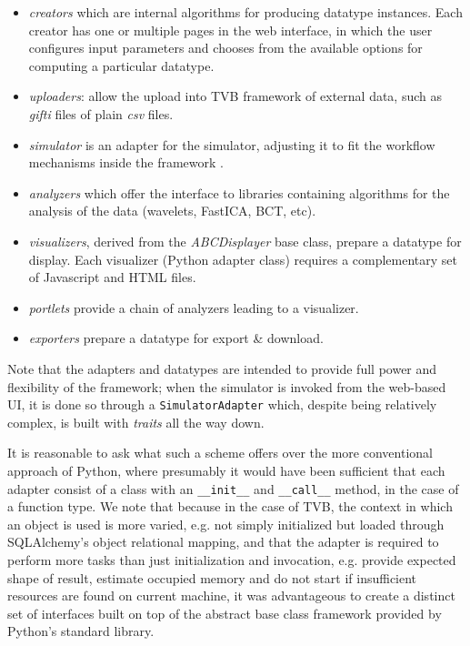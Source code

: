 \begin{itemize}
	\item \textit{creators} which are internal algorithms for producing datatype instances. 
		Each creator has one or multiple pages in the web interface, in which the user
		 configures input parameters and chooses from the available options for computing a particular datatype.

	\item \textit{uploaders}: allow the upload into TVB framework of external data, 
    		such as \emph{gifti} files of plain \emph{csv} files.

	\item \textit{simulator} is an adapter for the simulator, adjusting it to fit
		the workflow mechanisms inside the framework .

	\item \textit{analyzers} which offer the interface to libraries containing algorithms 
		for the analysis of the data (wavelets, FastICA, BCT, etc).

	\item \textit{visualizers}, derived from the \emph{ABCDisplayer} base class, prepare a datatype
		for display. Each visualizer (Python adapter class) requires a complementary set
		of Javascript and HTML files. 

	\item \textit{portlets} provide a chain of analyzers leading to a visualizer.

	\item \textit{exporters} prepare a datatype for export \& download.

\end{itemize}

Note that the adapters and datatypes are intended to provide full 
power and flexibility of the framework; when the simulator is invoked from
the web-based UI, it is done so through a \texttt{SimulatorAdapter} which,
despite being relatively complex, is built with \emph{traits} all the way down.

It is reasonable to ask what such a scheme offers over the more 
conventional approach of Python, where presumably it would have been
sufficient that each adapter consist of a class with an \texttt{\_\_init\_\_}
and \texttt{\_\_call\_\_} method, in the case of a function type. 
We note that because in the case of TVB, the context in which an object
is used is more varied, e.g. not simply initialized but loaded through 
SQLAlchemy's object relational mapping, and that the adapter is required to perform more tasks
than just initialization and invocation, e.g. provide expected shape of 
result, estimate occupied memory and do not start if insufficient resources are found on current machine,
 it was advantageous to create a distinct set of interfaces built on top of
the abstract base class framework provided by Python's standard library.

